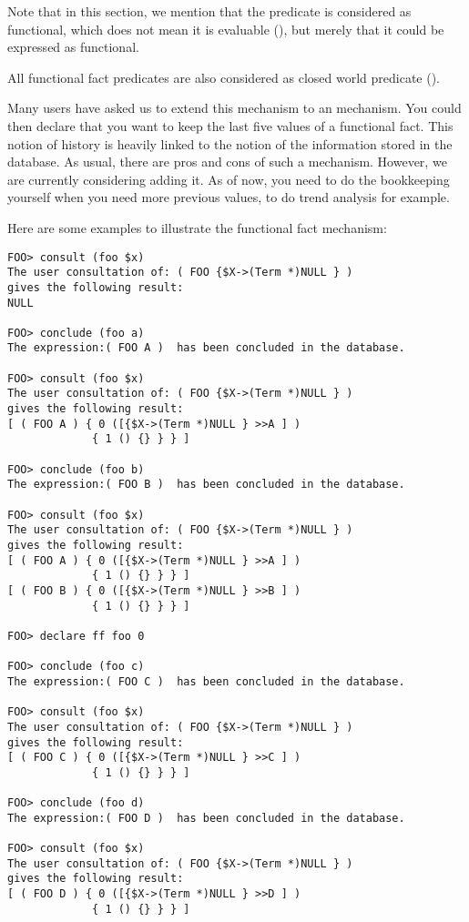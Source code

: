 Note that in this section, we mention that the predicate is considered as
functional, which does not mean it is evaluable (), but merely that it could be expressed as functional.

All functional fact predicates are also considered as closed world predicate
().

Many users have asked us to extend this mechanism to an 
mechanism. You could then declare that you want to keep the last five
values of a functional fact. This notion of history is heavily linked to
the notion of  the information stored in the database.
As usual, there are pros and cons of such a mechanism. However, we are
currently considering adding it. As of now, you need to do the bookkeeping
yourself when you need more previous values, to do trend analysis for
example.

Here are some examples to illustrate the functional fact mechanism:

\begin{verbatim}
FOO> consult (foo $x)
The user consultation of: ( FOO {$X->(Term *)NULL } )
gives the following result:
NULL

FOO> conclude (foo a)
The expression:( FOO A )  has been concluded in the database.

FOO> consult (foo $x)
The user consultation of: ( FOO {$X->(Term *)NULL } )
gives the following result:
[ ( FOO A ) { 0 ([{$X->(Term *)NULL } >>A ] )
             { 1 () {} } } ]

FOO> conclude (foo b)
The expression:( FOO B )  has been concluded in the database.

FOO> consult (foo $x)
The user consultation of: ( FOO {$X->(Term *)NULL } )
gives the following result:
[ ( FOO A ) { 0 ([{$X->(Term *)NULL } >>A ] )
             { 1 () {} } } ]
[ ( FOO B ) { 0 ([{$X->(Term *)NULL } >>B ] )
             { 1 () {} } } ]

FOO> declare ff foo 0

FOO> conclude (foo c)
The expression:( FOO C )  has been concluded in the database.

FOO> consult (foo $x)
The user consultation of: ( FOO {$X->(Term *)NULL } )
gives the following result:
[ ( FOO C ) { 0 ([{$X->(Term *)NULL } >>C ] )
             { 1 () {} } } ]

FOO> conclude (foo d)
The expression:( FOO D )  has been concluded in the database.

FOO> consult (foo $x)
The user consultation of: ( FOO {$X->(Term *)NULL } )
gives the following result:
[ ( FOO D ) { 0 ([{$X->(Term *)NULL } >>D ] )
             { 1 () {} } } ]
\end{verbatim}

